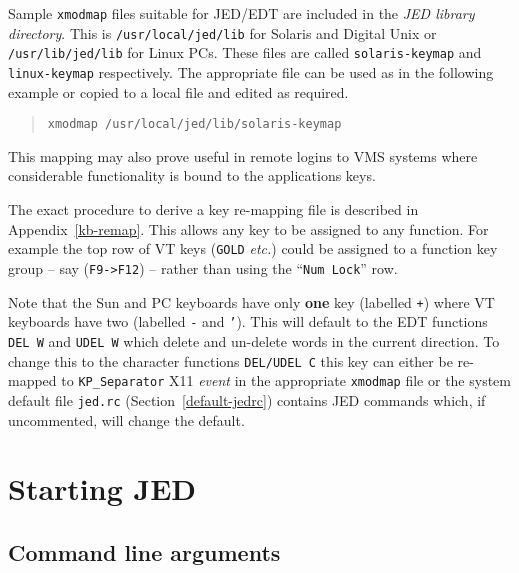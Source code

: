 \documentclass[twoside,11pt]{article}
\newcommand{\xlabel}[1]{}
\begin{document}
Sample \texttt{xmodmap} files suitable for JED/EDT are included in the
\textit{JED library directory}. This is \texttt{/usr/local/jed/lib} for
Solaris and Digital Unix or \texttt{/usr/lib/jed/lib} for Linux PCs.
These files are called \texttt{solaris-keymap} and
\texttt{linux-keymap} respectively. The appropriate file can be used as
in the following example or copied to a local file and edited as
required.

\begin{quote}
\begin{verbatim}
xmodmap /usr/local/jed/lib/solaris-keymap
\end{verbatim}
\end{quote}

This mapping may also prove useful in remote logins to VMS systems
where considerable functionality is bound to the applications keys.

The exact procedure to derive a key re-mapping file is described in
Appendix~{\ref{kb-remap}}. This allows any
key to be assigned to any function. For example the top row of VT keys 
(\texttt{GOLD} \textit{etc.}) could be assigned  to a function key group --
say (\texttt{F9->F12}) -- rather than using the 
``\texttt{Num Lock}'' row.

Note that the Sun and PC keyboards have only \textbf{one} key (labelled
\texttt{+}) where VT keyboards have two (labelled \texttt{-} and
\texttt{'}). This will default to the EDT
functions \texttt{DEL~W} and \texttt{UDEL~W} which delete and un-delete
words in the current direction. To change this to the character
functions \texttt{DEL/UDEL~C} this key can either be re-mapped to
\texttt{KP\_Separator} X11 \textit{event} in the appropriate 
\texttt{xmodmap} file or
the system default file \texttt{jed.rc} (Section~{\ref{default-jedrc}})
contains JED commands which, if uncommented, will change the default.

\section{\xlabel{starting_jed}Starting JED}
\label{starting_jed}

\subsection{\xlabel{command_line_arguments}Command line arguments}
\label{command_line_arguments}
\label{cl-switches}
\end{document}
